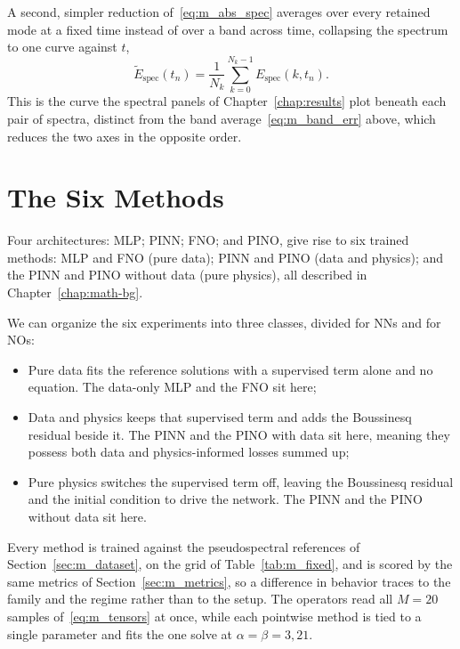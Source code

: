 A second, simpler reduction of~\eqref{eq:m_abs_spec} averages over every retained mode at a fixed time instead of over a band across time, collapsing the spectrum to one curve against $t$,
\begin{equation}\label{eq:m_spec_mean}
    \widetilde{E}_{\text{spec}}(t_n) = \frac{1}{N_k} \sum_{k=0}^{N_k-1} E_{\text{spec}}(k, t_n).
\end{equation}
This is the curve the spectral panels of Chapter~\ref{chap:results} plot beneath each pair of spectra, distinct from the band average~\eqref{eq:m_band_err} above, which reduces the two axes in the opposite order.

\section{The Six Methods}
\label{sec:m_ladder}

Four architectures: MLP; PINN; FNO; and PINO, give rise to six trained methods: MLP and FNO (pure data); PINN and PINO (data and physics); and the PINN and PINO without data (pure physics), all described in Chapter~\ref{chap:math-bg}. 

We can organize the six experiments into three classes, divided for NNs and for NOs:
\begin{itemize}
    \item Pure data fits the reference solutions with a supervised term alone and no equation. The data-only MLP and the FNO sit here;
    \item Data and physics keeps that supervised term and adds the Boussinesq residual beside it. The PINN and the PINO with data sit here, meaning they possess both data and physics-informed losses summed up;
    \item Pure physics switches the supervised term off, leaving the Boussinesq residual and the initial condition to drive the network. The PINN and the PINO without data sit here.
\end{itemize}

Every method is trained against the pseudospectral references of Section~\ref{sec:m_dataset}, on the grid of Table~\ref{tab:m_fixed}, and is scored by the same metrics of Section~\ref{sec:m_metrics}, so a difference in behavior traces to the family and the regime rather than to the setup. The operators read all $M = 20$ samples of~\eqref{eq:m_tensors} at once, while each pointwise method is tied to a single parameter and fits the one solve at $\alpha = \beta = 3{,}21$.

